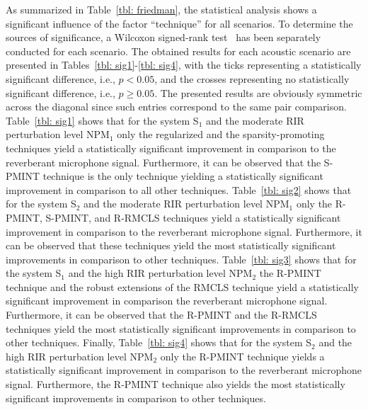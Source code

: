\documentclass[fleqn]{aes2e}
\begin{document}
As summarized in Table~\ref{tbl: friedman}, the statistical analysis shows a significant influence of the factor ``technique'' for all scenarios. 
To determine the sources of significance, a Wilcoxon signed-rank test~\cite{Gibbons_book} has been separately conducted for each scenario.
The obtained results for each acoustic scenario are presented in Tables~\ref{tbl: sig1}-\ref{tbl: sig4}, with the ticks representing a statistically significant difference, i.e., $p<0.05$, and the crosses representing no statistically significant difference, i.e., $p \geq 0.05$. 
The presented results are obviously symmetric across the diagonal since such entries correspond to the same pair comparison.
Table~\ref{tbl: sig1} shows that for the system S$_1$ and the moderate RIR perturbation level NPM$_1$ only the regularized and the sparsity-promoting techniques yield a statistically significant improvement in comparison to the reverberant microphone signal. 
Furthermore, it can be observed that the S-PMINT technique is the only technique yielding a statistically significant improvement in comparison to all other techniques.
Table~\ref{tbl: sig2} shows that for the system S$_2$ and the moderate RIR perturbation level NPM$_1$ only the R-PMINT, S-PMINT, and R-RMCLS techniques yield a statistically significant improvement in comparison to the reverberant microphone signal. 
Furthermore, it can be observed that these techniques yield the most statistically significant improvements in comparison to other techniques.
Table~\ref{tbl: sig3} shows that for the system S$_1$ and the high RIR perturbation level NPM$_2$ the R-PMINT technique and the robust extensions of the RMCLS technique yield a statistically significant improvement in comparison the reverberant microphone signal. 
Furthermore, it can be observed that the R-PMINT and the R-RMCLS techniques yield the most statistically significant improvements in comparison to other techniques.
Finally, Table~\ref{tbl: sig4} shows that for the system S$_2$ and the high RIR perturbation level NPM$_2$ only the R-PMINT technique yields a statistically significant improvement in comparison to the reverberant microphone signal. 
Furthermore, the R-PMINT technique also yields the most statistically significant improvements in comparison to other techniques.
\end{document}
